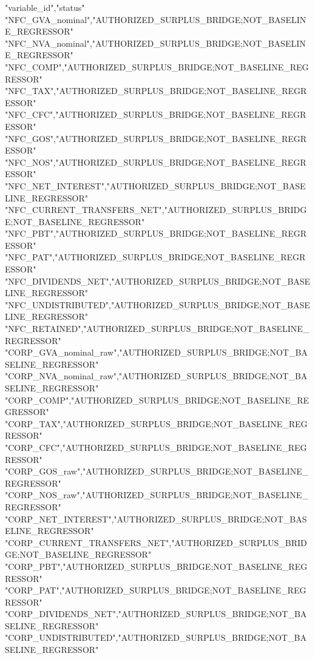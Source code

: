 "variable_id","status"
"NFC_GVA_nominal","AUTHORIZED_SURPLUS_BRIDGE;NOT_BASELINE_REGRESSOR"
"NFC_NVA_nominal","AUTHORIZED_SURPLUS_BRIDGE;NOT_BASELINE_REGRESSOR"
"NFC_COMP","AUTHORIZED_SURPLUS_BRIDGE;NOT_BASELINE_REGRESSOR"
"NFC_TAX","AUTHORIZED_SURPLUS_BRIDGE;NOT_BASELINE_REGRESSOR"
"NFC_CFC","AUTHORIZED_SURPLUS_BRIDGE;NOT_BASELINE_REGRESSOR"
"NFC_GOS","AUTHORIZED_SURPLUS_BRIDGE;NOT_BASELINE_REGRESSOR"
"NFC_NOS","AUTHORIZED_SURPLUS_BRIDGE;NOT_BASELINE_REGRESSOR"
"NFC_NET_INTEREST","AUTHORIZED_SURPLUS_BRIDGE;NOT_BASELINE_REGRESSOR"
"NFC_CURRENT_TRANSFERS_NET","AUTHORIZED_SURPLUS_BRIDGE;NOT_BASELINE_REGRESSOR"
"NFC_PBT","AUTHORIZED_SURPLUS_BRIDGE;NOT_BASELINE_REGRESSOR"
"NFC_PAT","AUTHORIZED_SURPLUS_BRIDGE;NOT_BASELINE_REGRESSOR"
"NFC_DIVIDENDS_NET","AUTHORIZED_SURPLUS_BRIDGE;NOT_BASELINE_REGRESSOR"
"NFC_UNDISTRIBUTED","AUTHORIZED_SURPLUS_BRIDGE;NOT_BASELINE_REGRESSOR"
"NFC_RETAINED","AUTHORIZED_SURPLUS_BRIDGE;NOT_BASELINE_REGRESSOR"
"CORP_GVA_nominal_raw","AUTHORIZED_SURPLUS_BRIDGE;NOT_BASELINE_REGRESSOR"
"CORP_NVA_nominal_raw","AUTHORIZED_SURPLUS_BRIDGE;NOT_BASELINE_REGRESSOR"
"CORP_COMP","AUTHORIZED_SURPLUS_BRIDGE;NOT_BASELINE_REGRESSOR"
"CORP_TAX","AUTHORIZED_SURPLUS_BRIDGE;NOT_BASELINE_REGRESSOR"
"CORP_CFC","AUTHORIZED_SURPLUS_BRIDGE;NOT_BASELINE_REGRESSOR"
"CORP_GOS_raw","AUTHORIZED_SURPLUS_BRIDGE;NOT_BASELINE_REGRESSOR"
"CORP_NOS_raw","AUTHORIZED_SURPLUS_BRIDGE;NOT_BASELINE_REGRESSOR"
"CORP_NET_INTEREST","AUTHORIZED_SURPLUS_BRIDGE;NOT_BASELINE_REGRESSOR"
"CORP_CURRENT_TRANSFERS_NET","AUTHORIZED_SURPLUS_BRIDGE;NOT_BASELINE_REGRESSOR"
"CORP_PBT","AUTHORIZED_SURPLUS_BRIDGE;NOT_BASELINE_REGRESSOR"
"CORP_PAT","AUTHORIZED_SURPLUS_BRIDGE;NOT_BASELINE_REGRESSOR"
"CORP_DIVIDENDS_NET","AUTHORIZED_SURPLUS_BRIDGE;NOT_BASELINE_REGRESSOR"
"CORP_UNDISTRIBUTED","AUTHORIZED_SURPLUS_BRIDGE;NOT_BASELINE_REGRESSOR"

